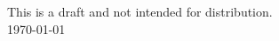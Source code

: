 \documentclass[twocolumn]{bmcart}%
\begin{document}
\begin{frontmatter}
\begin{fmbox}
\begin{artnotes}
\end{artnotes}

\end{fmbox}%


\begin{abstractbox}

This is a draft and not intended for distribution. \\
\today

\end{abstractbox}
%

\end{frontmatter}



%
\end{document}
